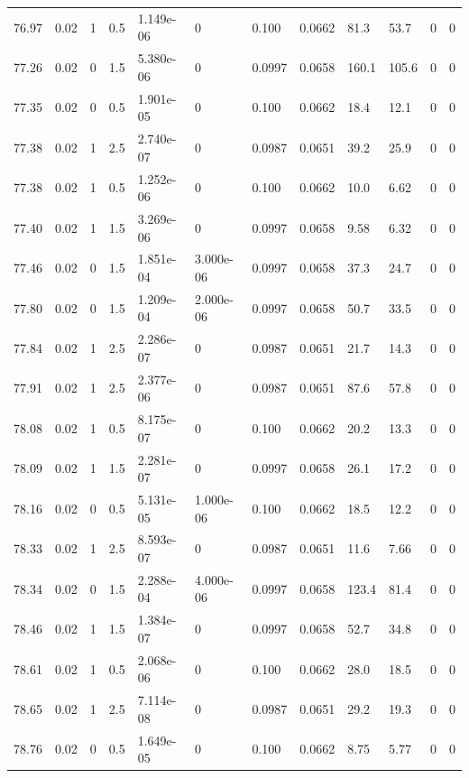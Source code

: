 \documentclass[preview]{standalone}
\begin{document}
{{{{{{{{{{{{{{{{{{\begin{tabular}{L{1.2cm}C{1.2cm} C{0.3cm}C{0.5cm} C{1.4cm}C{1.4cm} C{1.4cm}C{1.4cm} C{1.6cm}C{1.6cm} C{1.6cm}C{1.6cm}}
  76.97  &  0.02  & 1     & 0.5 &  1.149e-06  & 0  &  0.100&   0.0662& 81.3 & 53.7   &  0 & 0  \\ 
  77.26  &  0.02  & 0     & 1.5 &  5.380e-06  & 0  &  0.0997&   0.0658& 160.1 & 105.6   &  0 & 0  \\ 
  77.35  &  0.02  & 0     & 0.5 &  1.901e-05  & 0  &  0.100&   0.0662& 18.4 & 12.1   &  0 & 0  \\ 
  77.38  &  0.02  & 1     & 2.5 &  2.740e-07  & 0  &  0.0987&   0.0651& 39.2 & 25.9   &  0 & 0  \\ 
  77.38  &  0.02  & 1     & 0.5 &  1.252e-06  & 0  &  0.100&   0.0662& 10.0 & 6.62   &  0 & 0  \\ 
  77.40  &  0.02  & 1     & 1.5 &  3.269e-06  & 0  &  0.0997&   0.0658& 9.58 & 6.32   &  0 & 0  \\ 
  77.46  &  0.02  & 0     & 1.5 &  1.851e-04  & 3.000e-06  &  0.0997&   0.0658& 37.3 & 24.7   &  0 & 0  \\ 
  77.80  &  0.02  & 0     & 1.5 &  1.209e-04  & 2.000e-06  &  0.0997&   0.0658& 50.7 & 33.5   &  0 & 0  \\ 
  77.84  &  0.02  & 1     & 2.5 &  2.286e-07  & 0  &  0.0987&   0.0651& 21.7 & 14.3   &  0 & 0  \\ 
  77.91  &  0.02  & 1     & 2.5 &  2.377e-06  & 0  &  0.0987&   0.0651& 87.6 & 57.8   &  0 & 0  \\ 
  78.08  &  0.02  & 1     & 0.5 &  8.175e-07  & 0  &  0.100&   0.0662& 20.2 & 13.3   &  0 & 0  \\ 
  78.09  &  0.02  & 1     & 1.5 &  2.281e-07  & 0  &  0.0997&   0.0658& 26.1 & 17.2   &  0 & 0  \\ 
  78.16  &  0.02  & 0     & 0.5 &  5.131e-05  & 1.000e-06  &  0.100&   0.0662& 18.5 & 12.2   &  0 & 0  \\ 
  78.33  &  0.02  & 1     & 2.5 &  8.593e-07  & 0  &  0.0987&   0.0651& 11.6 & 7.66   &  0 & 0  \\ 
  78.34  &  0.02  & 0     & 1.5 &  2.288e-04  & 4.000e-06  &  0.0997&   0.0658& 123.4 & 81.4   &  0 & 0  \\ 
  78.46  &  0.02  & 1     & 1.5 &  1.384e-07  & 0  &  0.0997&   0.0658& 52.7 & 34.8   &  0 & 0  \\ 
  78.61  &  0.02  & 1     & 0.5 &  2.068e-06  & 0  &  0.100&   0.0662& 28.0 & 18.5   &  0 & 0  \\ 
  78.65  &  0.02  & 1     & 2.5 &  7.114e-08  & 0  &  0.0987&   0.0651& 29.2 & 19.3   &  0 & 0  \\ 
  78.76  &  0.02  & 0     & 0.5 &  1.649e-05  & 0  &  0.100&   0.0662& 8.75 & 5.77   &  0 & 0  \\ 

\end{tabular}}}}}}}}}}}}}}}}}}}
\end{document}
